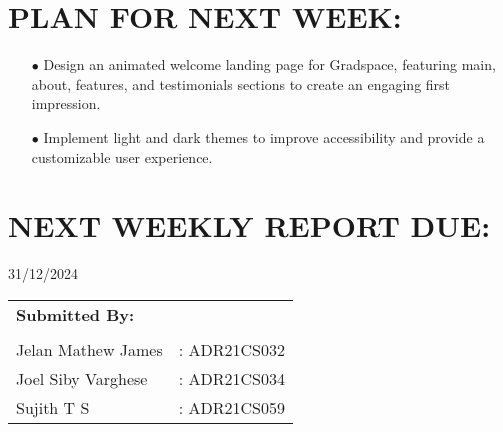 \documentclass[12pt]{article}
\begin{document}
	\section*{\fontsize{14}{14.4}\selectfont \textbf{PLAN FOR NEXT WEEK:}}
	\begin{itemize}
		\item[$\bullet$] Design an animated welcome landing page for Gradspace, featuring main, about, features, and testimonials sections to create an engaging first impression. 

		\item[$\bullet$] Implement light and dark themes to improve accessibility and provide a customizable user experience.

	\end{itemize}
	
	\section*{\fontsize{14}{14.4}\selectfont \textbf{NEXT WEEKLY REPORT DUE:}} 31/12/2024
	
		\begin{flushright}
		
		
		\begin{tabular}{ll}
			\textbf{Submitted By:} \\
			\\
			Jelan Mathew James      & : ADR21CS032 \\
			Joel Siby Varghese & : ADR21CS034 \\
			Sujith T S         & : ADR21CS059 \\
		\end{tabular}
	\end{flushright}
	
\end{document}
